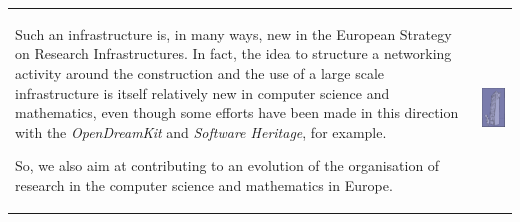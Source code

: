 \begin{tabular}{p{}p{}}
\begin{minipage}{11.85cm}
\hspace{0.4cm} Such an infrastructure is, in many ways, new in the
European Strategy on Research Infrastructures. In fact, the idea to
structure a networking activity around the construction and the use of
a large scale infrastructure is itself relatively new in computer
science and mathematics, even though some efforts have been made in
this direction with the {\em OpenDreamKit} and {\em Software
  Heritage}, for example.

\hspace{0.4cm} So, we also aim at contributing to an evolution of the
organisation of research in the computer science and mathematics in
Europe.
\end{minipage}
&
\begin{minipage}{4cm}

\includegraphics[width=4cm]{img/Illustration1-reduced.jpg}

\end{minipage}
\\
\end{tabular}



\begin{center}
\end{center}



